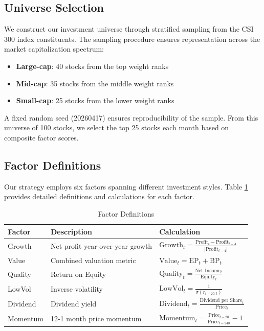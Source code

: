 \documentclass[12pt,a4paper]{article}
\begin{document}
\subsection{Universe Selection}

We construct our investment universe through stratified sampling from the CSI 300 index constituents. The sampling procedure ensures representation across the market capitalization spectrum:

\begin{itemize}
    \item \textbf{Large-cap}: 40 stocks from the top weight ranks
    \item \textbf{Mid-cap}: 35 stocks from the middle weight ranks
    \item \textbf{Small-cap}: 25 stocks from the lower weight ranks
\end{itemize}

A fixed random seed (20260417) ensures reproducibility of the sample. From this universe of 100 stocks, we select the top 25 stocks each month based on composite factor scores.

\subsection{Factor Definitions}

Our strategy employs six factors spanning different investment styles. Table \ref{tab:factor_defs} provides detailed definitions and calculations for each factor.

\begin{table}[H]
\centering
\caption{Factor Definitions}
\label{tab:factor_defs}
\begin{tabular}{@{}p{2.5cm}p{4cm}p{6cm}@{}}
\toprule
\textbf{Factor} & \textbf{Description} & \textbf{Calculation} \\
\midrule
Growth & Net profit year-over-year growth & $\text{Growth}_t = \frac{\text{Profit}_t - \text{Profit}_{t-4}}{|\text{Profit}_{t-4}|}$ \\
\addlinespace
Value & Combined valuation metric & $\text{Value}_t = \text{EP}_t + \text{BP}_t$ \\
\addlinespace
Quality & Return on Equity & $\text{Quality}_t = \frac{\text{Net Income}_t}{\text{Equity}_t}$ \\
\addlinespace
LowVol & Inverse volatility & $\text{LowVol}_t = \frac{1}{\sigma(r_{t-20:t})}$ \\
\addlinespace
Dividend & Dividend yield & $\text{Dividend}_t = \frac{\text{Dividend per Share}_t}{\text{Price}_t}$ \\
\addlinespace
Momentum & 12-1 month price momentum & $\text{Momentum}_t = \frac{\text{Price}_{t-20}}{\text{Price}_{t-240}} - 1$ \\
\bottomrule
\end{tabular}
\end{table}
\end{document}
